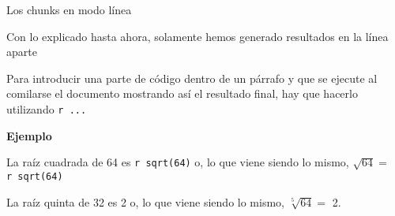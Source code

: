 \documentclass[
  ignorenonframetext,
]{beamer}
\begin{document}
\begin{frame}[fragile]{Los chunks en modo línea}
\protect\hypertarget{los-chunks-en-modo-luxednea-1}{}

Con lo explicado hasta ahora, solamente hemos generado resultados en la
línea aparte

Para introducir una parte de código dentro de un párrafo y que se
ejecute al comilarse el documento mostrando así el resultado final, hay
que hacerlo utilizando \texttt{\textasciigrave{}r\ ...\textasciigrave{}}

\textbf{Ejemplo}

La raíz cuadrada de 64 es
\texttt{\textasciigrave{}r\ sqrt(64)\textasciigrave{}} o, lo que viene
siendo lo mismo,
\(\sqrt{64}=\)\texttt{\textasciigrave{}r\ sqrt(64)\textasciigrave{}}

La raíz quinta de 32 es 2 o, lo que viene siendo lo mismo,
\(\sqrt[5]{64}=\) 2.

\end{frame}
\end{document}

